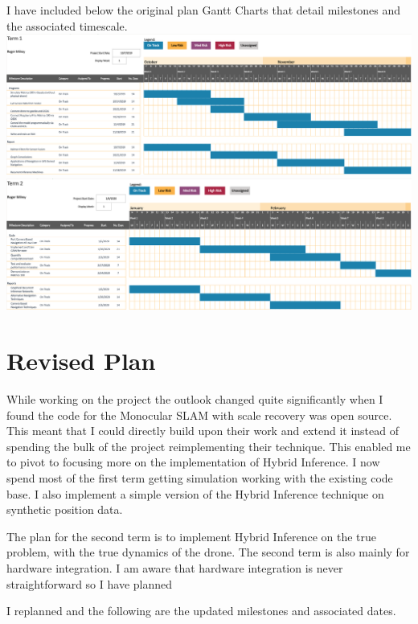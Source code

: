 \documentclass[]{../resources/final_report}
\begin{document}
I have included below the original plan Gantt Charts that detail milestones and the associated timescale.
\\
\includegraphics[width=\textwidth]{../resources/images/Term1Ganttv1.png}
\includegraphics[width=\textwidth]{../resources/images/Term2Ganttv1.png}

\pagebreak
\section{Revised Plan}

While working on the project the outlook changed quite significantly when I found the code for the Monocular SLAM with scale recovery was open source. 
This meant that I could directly build upon their work and extend it instead of spending the bulk of the project reimplementing their technique.
This enabled me to pivot to focusing more on the implementation of Hybrid Inference. I now spend most of the first term getting simulation working with the existing code base.
I also implement a simple version of the Hybrid Inference technique on synthetic position data.

The plan for the second term is to implement Hybrid Inference on the true problem, with the true dynamics of the drone. The second term is also mainly for hardware integration.
I am aware that hardware integration is never straightforward so I have planned 

I replanned and the following are the updated milestones and associated dates.
\end{document}
